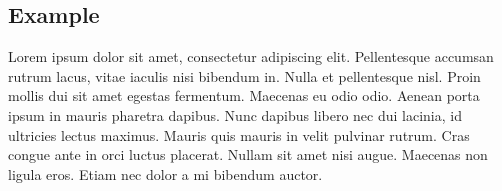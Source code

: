 
\begin{anexosenv}
\chapter{Example}

Lorem ipsum dolor sit amet, consectetur adipiscing elit. Pellentesque accumsan rutrum lacus, vitae iaculis nisi bibendum in. Nulla et pellentesque nisl. Proin mollis dui sit amet egestas fermentum. Maecenas eu odio odio. Aenean porta ipsum in mauris pharetra dapibus. Nunc dapibus libero nec dui lacinia, id ultricies lectus maximus. Mauris quis mauris in velit pulvinar rutrum. Cras congue ante in orci luctus placerat. Nullam sit amet nisi augue. Maecenas non ligula eros. Etiam nec dolor a mi bibendum auctor.

\clearpage

\end{anexosenv}

%
%
